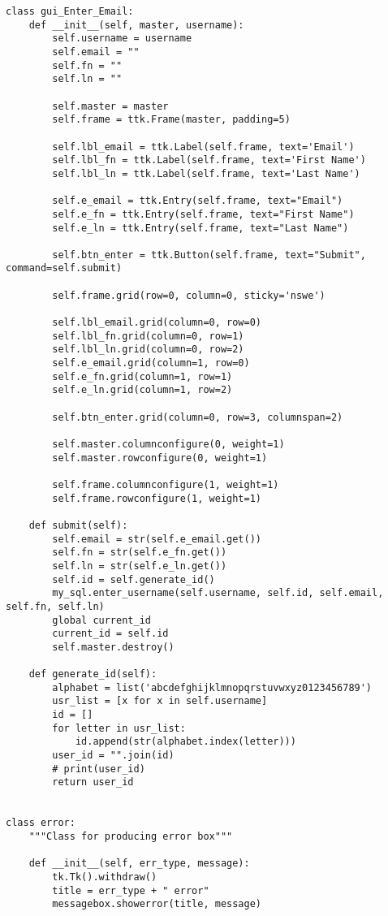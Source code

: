 \documentclass[11pt, a4paper]{article}
\begin{document}
\begin{lstlisting}
class gui_Enter_Email:
    def __init__(self, master, username):
        self.username = username
        self.email = ""
        self.fn = ""
        self.ln = ""

        self.master = master
        self.frame = ttk.Frame(master, padding=5)

        self.lbl_email = ttk.Label(self.frame, text='Email')
        self.lbl_fn = ttk.Label(self.frame, text='First Name')
        self.lbl_ln = ttk.Label(self.frame, text='Last Name')

        self.e_email = ttk.Entry(self.frame, text="Email")
        self.e_fn = ttk.Entry(self.frame, text="First Name")
        self.e_ln = ttk.Entry(self.frame, text="Last Name")

        self.btn_enter = ttk.Button(self.frame, text="Submit", command=self.submit)

        self.frame.grid(row=0, column=0, sticky='nswe')

        self.lbl_email.grid(column=0, row=0)
        self.lbl_fn.grid(column=0, row=1)
        self.lbl_ln.grid(column=0, row=2)
        self.e_email.grid(column=1, row=0)
        self.e_fn.grid(column=1, row=1)
        self.e_ln.grid(column=1, row=2)

        self.btn_enter.grid(column=0, row=3, columnspan=2)

        self.master.columnconfigure(0, weight=1)
        self.master.rowconfigure(0, weight=1)

        self.frame.columnconfigure(1, weight=1)
        self.frame.rowconfigure(1, weight=1)

    def submit(self):
        self.email = str(self.e_email.get())
        self.fn = str(self.e_fn.get())
        self.ln = str(self.e_ln.get())
        self.id = self.generate_id()
        my_sql.enter_username(self.username, self.id, self.email, self.fn, self.ln)
        global current_id
        current_id = self.id
        self.master.destroy()

    def generate_id(self):
        alphabet = list('abcdefghijklmnopqrstuvwxyz0123456789')
        usr_list = [x for x in self.username]
        id = []
        for letter in usr_list:
            id.append(str(alphabet.index(letter)))
        user_id = "".join(id)
        # print(user_id)
        return user_id


class error:
    """Class for producing error box"""

    def __init__(self, err_type, message):
        tk.Tk().withdraw()
        title = err_type + " error"
        messagebox.showerror(title, message)



\end{lstlisting}
\end{document}
